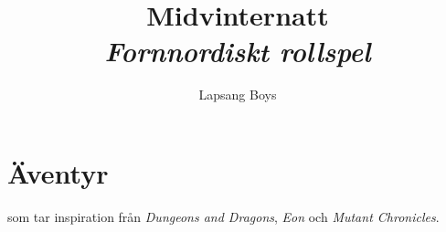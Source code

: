 \documentclass[10pt,twoside,twocolumn,openany]{dndbook}
\title{Midvinternatt \\ \large{\textit{Fornnordiskt rollspel}}}
\author{Lapsang Boys}
\begin{document}
\frontmatter

\maketitle

\tableofcontents

\mainmatter

\chapter{Äventyr}

 som tar inspiration från \emph{Dungeons and Dragons}, \emph{Eon} och \emph{Mutant Chronicles}.
\end{document}
